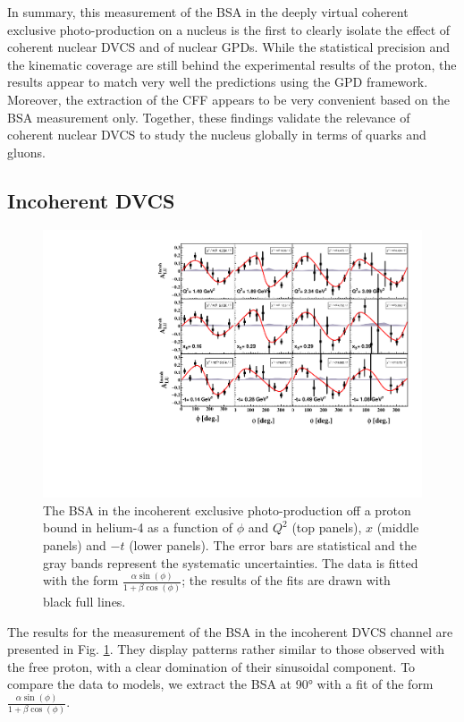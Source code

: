 \documentclass[aps,prc,preprint,superscriptaddress]{revtex4}
\begin{document}
In summary, this measurement of the BSA in the deeply virtual coherent exclusive 
photo-production on a nucleus is the first to clearly isolate the effect of 
coherent nuclear DVCS and of nuclear GPDs. While the statistical precision and 
the kinematic coverage are still behind the experimental results of
the proton, the results appear to match very well the predictions using the GPD 
framework. Moreover, the extraction of the CFF appears to be very convenient based
on the BSA measurement only. Together, these findings  validate the relevance of
coherent nuclear DVCS to study the nucleus globally in terms of quarks and 
gluons. 

\subsection{Incoherent DVCS}

\begin{figure}[bp!]
\center
\includegraphics[width=15cm]{incoherent_ALU_phi.pdf}
	\caption{The BSA in the incoherent exclusive photo-production off a proton bound in
	helium-4 as a function of $\phi$ and $Q^2$ 
	(top panels), $x$ (middle panels) and $-t$ (lower panels). The error bars are  
	statistical and the gray bands represent the systematic uncertainties. The data is fitted with the 
	form $\frac{\alpha \sin(\phi)}{1+\beta \cos(\phi)}$; the results of the 
	fits are drawn with black full lines.}
\label{fig:InCohALUphi}
\end{figure}

The results for the measurement of the BSA in the incoherent DVCS channel are presented in
Fig. \ref{fig:InCohALUphi}. They display patterns rather similar to those observed with the 
free proton, with a clear domination of their sinusoidal component. To compare the data to 
models, we extract the BSA at 90° with a fit of the form $\frac{\alpha \sin(\phi)}{1+\beta \cos(\phi)}$. 
\end{document}
